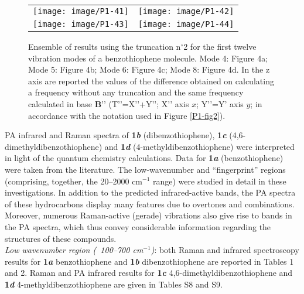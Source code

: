 	
	\begin{figure}[H]
		\begin{center}
			\begin{tabular}{c c}
				\texttt{[image: image/P1-41]} & \texttt{[image: image/P1-42]}\\
				\texttt{[image: image/P1-43]} & \texttt{[image: image/P1-44]}\\
			\end{tabular}
		\end{center}
		\caption[Ensemble of results using the truncation n$^{\circ}$2 for the first twelve vibration modes of a benzothiophene molecule]{Ensemble of results using the truncation n$^{\circ}$2 for the first twelve vibration modes of a benzothiophene molecule. Mode 4: Figure 4a; Mode 5: Figure 4b; Mode 6: Figure 4c;  Mode 8: Figure 4d.
			In the z axis are reported the values of the difference obtained on calculating a frequency without any truncation and the same frequency calculated in base $\textbf{B’’}$ (T’’=X’’+Y’’; X’’ axis $x$; Y’’=Y’ axis $y$; in accordance with the notation used in Figure \ref{P1-fig2}).}
	\end{figure}
	
	
	PA infrared and Raman spectra of \textbf{1\textit{b}} (dibenzothiophene), \textbf{1\textit{c}} (4,6-dimethyldibenzothiophene) and \textbf{1\textit{d}} (4-methyldibenzothiophene) were interpreted in light of the quantum chemistry calculations. Data for \textbf{1\textit{a}} (benzothiophene) were taken from the literature. The low-wavenumber and “fingerprint” regions (comprising, together, the 20–2000 cm$^{-1}$ range) were studied in detail in these investigations. In addition to the predicted infrared-active bands, the PA spectra of these hydrocarbons display many features due to overtones and combinations. Moreover, numerous Raman-active (gerade) vibrations also give rise to bands in the PA spectra, which thus convey considerable information regarding the structures of these compounds.\\
	
	
	\textit{Low wavenumber region (~100–700 cm$^{-1}$)}: both Raman and infrared spectroscopy results for \textbf{1\textit{a}} benzothiophene and \textbf{1\textit{b}} dibenzothiophene are reported in Tables 1 and 2. Raman and PA infrared results for \textbf{1\textit{c}} 4,6-dimethyldibenzothiophene and \textbf{1\textit{d}} 4-methyldibenzothiophene are given in Tables S8 and S9.\\
	
